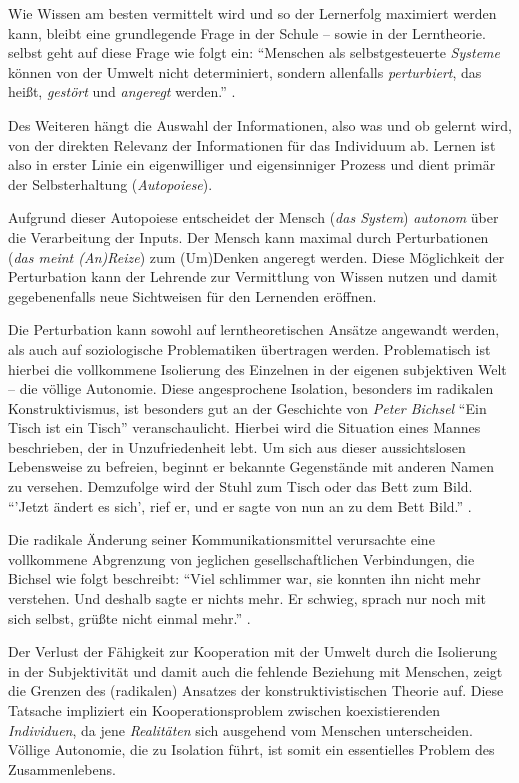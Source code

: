Wie Wissen am besten vermittelt wird und so der Lernerfolg maximiert werden kann, bleibt eine grundlegende Frage in der Schule -- sowie in der Lerntheorie.
\citeauthor{siebert-2003}  selbst geht auf diese Frage wie folgt ein:
``Menschen als selbstgesteuerte \emph{Systeme} können von der Umwelt nicht determiniert, sondern allenfalls \emph{perturbiert}, das heißt, \emph{gestört} und \emph{angeregt} werden.'' \parencite[vgl.][5]{siebert-2003}.

Des Weiteren hängt die Auswahl der Informationen, also was und ob gelernt wird, von der direkten Relevanz der Informationen für das Individuum ab.
Lernen ist also in erster Linie ein eigenwilliger und eigensinniger Prozess und dient primär der Selbsterhaltung (\emph{Autopoiese}).

Aufgrund dieser Autopoiese entscheidet der Mensch (\emph{das System}) \emph{autonom} über die Verarbeitung der Inputs.
Der Mensch kann maximal durch Perturbationen (\emph{das meint (An)Reize}) zum (Um)Denken angeregt werden.
Diese Möglichkeit der Perturbation kann der Lehrende zur Vermittlung von Wissen nutzen und damit gegebenenfalls neue Sichtweisen für den Lernenden eröffnen.

Die Perturbation kann sowohl auf lerntheoretischen Ansätze angewandt werden, als auch auf soziologische Problematiken übertragen werden.
Problematisch ist hierbei die vollkommene Isolierung des Einzelnen in der eigenen subjektiven Welt -- die völlige Autonomie.
Diese angesprochene Isolation, besonders im radikalen Konstruktivismus, ist besonders gut an der Geschichte von \emph{Peter Bichsel} ``Ein Tisch ist ein Tisch'' veranschaulicht.
Hierbei wird die Situation eines Mannes beschrieben, der in Unzufriedenheit lebt.
Um sich aus dieser aussichtslosen Lebensweise zu befreien, beginnt er bekannte Gegenstände mit anderen Namen zu versehen.
Demzufolge wird der Stuhl zum Tisch oder das Bett zum Bild.
``'Jetzt ändert es sich', rief er, und er sagte von nun an zu dem Bett Bild.'' \parencite[vgl.][18]{bichsel-1990}.

Die radikale Änderung seiner Kommunikationsmittel verursachte eine vollkommene Abgrenzung von jeglichen gesellschaftlichen Verbindungen, die Bichsel wie folgt beschreibt:
``Viel schlimmer war, sie konnten ihn nicht mehr verstehen. Und deshalb sagte er nichts mehr. Er schwieg, sprach nur noch mit sich selbst, grüßte nicht einmal mehr.'' \parencite[vgl.][25]{bichsel-1990}.

Der Verlust der Fähigkeit zur Kooperation mit der Umwelt durch die Isolierung in der Subjektivität und damit auch die fehlende Beziehung mit Menschen, zeigt die Grenzen des (radikalen) Ansatzes der konstruktivistischen Theorie auf.
Diese Tatsache impliziert ein Kooperationsproblem zwischen koexistierenden \emph{Individuen}, da jene \emph{Realitäten} sich ausgehend vom Menschen unterscheiden.
Völlige Autonomie, die zu Isolation führt, ist somit ein essentielles Problem des Zusammenlebens.
